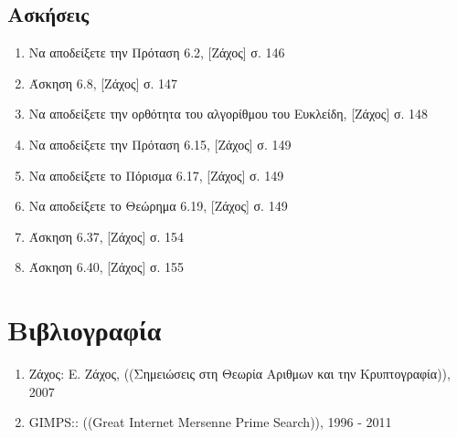 \documentclass[11pt,a4paper]{book}
\begin{document}
\subsection*{Ασκήσεις}
\begin{enumerate}
	\item Να αποδείξετε την Πρόταση 6.2, [Ζάχος] σ. 146
	\item Άσκηση 6.8, [Ζάχος] σ. 147
	\item Να αποδείξετε την ορθότητα του αλγορίθμου του Ευκλείδη, [Ζάχος] σ. 148
	\item Να αποδείξετε την Πρόταση 6.15, [Ζάχος] σ. 149
	\item Να αποδείξετε το Πόρισμα 6.17, [Ζάχος] σ. 149
	\item Να αποδείξετε το Θεώρημα 6.19, [Ζάχος] σ. 149
	\item Άσκηση 6.37, [Ζάχος] σ. 154
	\item Άσκηση 6.40, [Ζάχος] σ. 155
\end{enumerate}

\section*{Βιβλιογραφία}
\begin{enumerate}
	\item \text{[}Ζάχος\text{]}: Ε. Ζάχος, ((Σημειώσεις στη Θεωρία Αριθμων και την Κρυπτογραφία)), 2007
	\item \text{[}\textlatin{GIMPS}\text{]}:: ((\textlatin{Great Internet Mersenne Prime Search})), 1996 - 2011
\end{enumerate}
\end{document}
